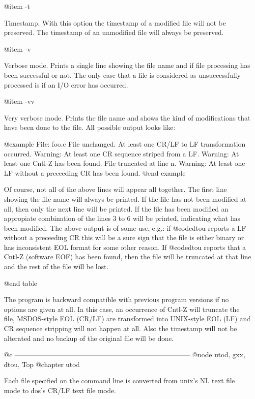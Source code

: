 @item -t

Timestamp.  With this option the timestamp of a modified file will not be
preserved.  The timestamp of an unmodified file will always be preserved.

@item -v

Verbose mode.  Prints a single line showing the file name and if file
processing has been successful or not.  The only case that a file is
considered as unsuccessfully processed is if an I/O error has occurred.

@item -vv

Very verbose mode.  Prints the file name and shows the kind of modifications
that have been done to the file.  All possible output looks like:

@example
File: foo.c
File unchanged.
At least one CR/LF to LF transformation occurred.
Warning: At least one CR sequence striped from a LF.
Warning: At least one Cntl-Z has been found. File truncated
         at line n.
Warning: At least one LF without a preceeding CR has been found.
@end example

Of course, not all of the above lines will appear all together.  The first
line showing the file name will always be printed.  If the file has not been
modified at all, then only the next line will be printed.  If the file has
been modified an appropiate combination of the lines 3 to 6 will be printed,
indicating what has been modified.  The above output is of some use, e.g.:
if @code{dtou} reports a LF without a preceeding CR this will be a sure sign
that the file is either binary or has inconsistent EOL format for some other
reason.  If @code{dtou} reports that a Cntl-Z (software EOF) has been found,
then the file will be truncated at that line and the rest of the file will be
lost.

@end table

The program is backward compatible with previous program versions if no options
are given at all.  In this case, an occurrence of Cntl-Z will truncate the file,
MSDOS-style EOL (CR/LF) are transformed into UNIX-style EOL (LF) and CR sequence
stripping will not happen at all.  Also the timestamp will not be alterated and
no backup of the original file will be done.

@c -----------------------------------------------------------------------------
@node utod, gxx, dtou, Top
@chapter utod

Each file specified on the command line is converted from unix's NL text
file mode to dos's CR/LF text file mode.

